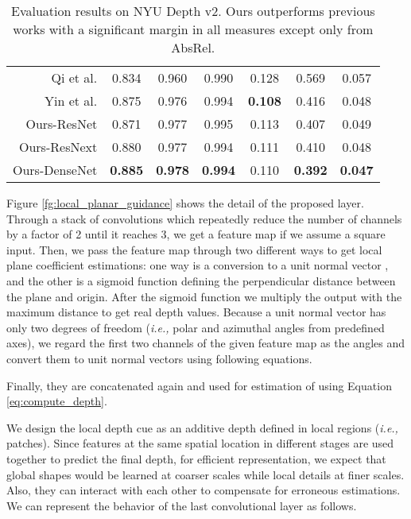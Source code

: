 \documentclass[10pt,twocolumn,letterpaper]{article}
\begin{document}
\begin{table}[t]
{\begin{tabular}{r|ccc|ccc}
			Qi et al. \cite{qi2018geonet}    & 0.834 & 0.960 & 0.990 & 0.128 & 0.569 & 0.057 \\ 
			Yin et al. \cite{yin2019enforcing} & 0.875 & 0.976 & 0.994 & \bf{0.108} & 0.416 & 0.048 \\ \hline
			Ours-ResNet   & 0.871 & 0.977 & 0.995 & 0.113 & 0.407 & 0.049 \\
			Ours-ResNext  & 0.880 & 0.977 & 0.994 & 0.111 & 0.410 & 0.048 \\
			Ours-DenseNet & \bf{0.885} & \bf{0.978} & \bf{0.994} & 0.110 & \bf{0.392} & \bf{0.047} \\ \hline
		\end{tabular}
	}
	\caption{Evaluation results on NYU Depth v2. Ours outperforms previous works with a significant margin in all measures except only from AbsRel.}
	\label{tb:nyu}	
	\vspace{-0.5cm}
\end{table}

Figure \ref{fg:local_planar_guidance} shows the detail of the proposed layer.
Through a stack of  convolutions which repeatedly reduce the number of channels by a factor of 2 until it reaches 3, we get a  feature map if we assume a square input.
Then, we pass the feature map through two different ways to get local plane coefficient estimations: one way is a conversion to a unit normal vector , and the other is a sigmoid function defining the perpendicular distance  between the plane and origin.
After the sigmoid function we multiply the output with the maximum distance  to get real depth values.
Because a unit normal vector has only two degrees of freedom (\textit{i.e.,} polar and azimuthal angles  from predefined axes), we regard the first two channels of the given feature map as the angles and convert them to unit normal vectors using following equations.

Finally, they are concatenated again and used for estimation of  using Equation \ref{eq:compute_depth}.

We design the local depth cue as an additive depth defined in local regions (\textit{i.e.,}  patches).
Since features at the same spatial location in different stages are used together to predict the final depth, for efficient representation, we expect that global shapes would be learned at coarser scales while local details at finer scales.
Also, they can interact with each other to compensate for erroneous estimations.
We can represent the behavior of the last convolutional layer as follows.
\end{document}
